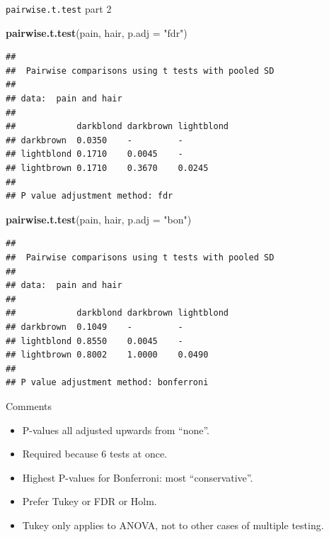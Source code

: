 \documentclass[ignorenonframetext,]{beamer}
\newenvironment{Shaded}{\begin{snugshade}}{\end{snugshade}}
\newcommand{\DataTypeTok}[1]{\textcolor[rgb]{0.13,0.29,0.53}{#1}}
\newcommand{\KeywordTok}[1]{\textcolor[rgb]{0.13,0.29,0.53}{\textbf{#1}}}
\newcommand{\NormalTok}[1]{#1}
\newcommand{\StringTok}[1]{\textcolor[rgb]{0.31,0.60,0.02}{#1}}
\begin{document}
\begin{frame}[fragile]{\texttt{pairwise.t.test} part 2}
\protect\hypertarget{pairwise.t.test-part-2}{}

\tiny

\begin{Shaded}
\begin{Highlighting}[]
\KeywordTok{pairwise.t.test}\NormalTok{(pain, hair, }\DataTypeTok{p.adj =} \StringTok{"fdr"}\NormalTok{)}
\end{Highlighting}
\end{Shaded}

\begin{verbatim}
## 
##  Pairwise comparisons using t tests with pooled SD 
## 
## data:  pain and hair 
## 
##            darkblond darkbrown lightblond
## darkbrown  0.0350    -         -         
## lightblond 0.1710    0.0045    -         
## lightbrown 0.1710    0.3670    0.0245    
## 
## P value adjustment method: fdr
\end{verbatim}

\begin{Shaded}
\begin{Highlighting}[]
\KeywordTok{pairwise.t.test}\NormalTok{(pain, hair, }\DataTypeTok{p.adj =} \StringTok{"bon"}\NormalTok{)}
\end{Highlighting}
\end{Shaded}

\begin{verbatim}
## 
##  Pairwise comparisons using t tests with pooled SD 
## 
## data:  pain and hair 
## 
##            darkblond darkbrown lightblond
## darkbrown  0.1049    -         -         
## lightblond 0.8550    0.0045    -         
## lightbrown 0.8002    1.0000    0.0490    
## 
## P value adjustment method: bonferroni
\end{verbatim}

\normalsize

\end{frame}

\begin{frame}{Comments}
\protect\hypertarget{comments-16}{}

\begin{itemize}
\item
  P-values all adjusted upwards from ``none''.
\item
  Required because 6 tests at once.
\item
  Highest P-values for Bonferroni: most ``conservative''.
\item
  Prefer Tukey or FDR or Holm.
\item
  Tukey only applies to ANOVA, not to other cases of multiple testing.
\end{itemize}

\end{frame}
\end{document}
